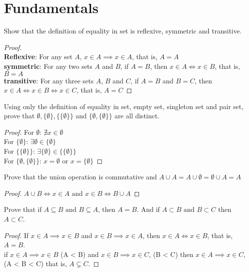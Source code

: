 \section{Fundamentals}

\begin{exercise}
  Show that the definition of equality in set is reflexive, symmetric and transitive.
\end{exercise}
\begin{proof}
  \\ \textbf{Reflexive}: For any set $A$, $x \in A \implies x \in A$, that is, $A = A$ \\
  \textbf{symmetric}: For any two sets $A$ and $B$, if $A = B$, then $x \in A \iff x \in B$, that is, $B = A$ \\
  \textbf{transitive}: For any three sets $A$, $B$ and $C$, if $A = B$ and $B = C$, then $x \in A \iff x \in B \iff x \in C$, that is, $A = C$
\end{proof}

\begin{exercise}
  Using only the definition of equality in set, empty set, singleton set and pair set, prove that $\emptyset, \{\emptyset\}, \{\{\emptyset\}\}$ and $\{\emptyset, \{\emptyset\}\}$
  are all distinct.
\end{exercise}
\begin{proof}
  For $\emptyset$: $\nexists x \in \emptyset$ \\
  For $\{\emptyset\}$: $\exists \emptyset \in \{\emptyset\}$ \\ 
  For $\{\{\emptyset\}\}$: $\exists \{\emptyset\} \in \{\{\emptyset\}\}$ \\
  For $\{\emptyset, \{\emptyset\}\}$: $x = \emptyset \text{\ or\ } x = \{\emptyset\}$
\end{proof} 

\begin{exercise}
  Prove that the union operation is commutative and $A \cup A = A \cup \emptyset = \emptyset \cup A = A$
\end{exercise}
\begin{proof}
  $A \cup B \iff x \in A \text{\ and\ } x \in B \iff B \cup A$
\end{proof}

\begin{exercise}
  Prove that if $A \subseteq B \text{\ and\ } B \subseteq A$, then $A = B$. And if $A \subset B \text{\ and\ } B \subset C$ then $A \subset C$.
\end{exercise}
\begin{proof}
  If $x \in A \implies x \in B$ and $x \in B \implies x \in A$, then $x \in A \iff x \in B$, that is, $A = B$. \\
  if $x \in A \implies x \in B$ (A < B) and $x \in B \implies x \in C$, (B < C) 
  then $x \in A \implies x \in C$, (A < B < C) that is, $A \subsetneq C$.
\end{proof}

